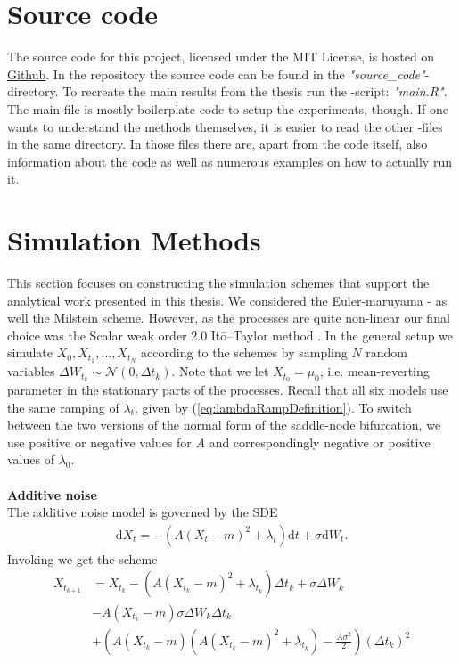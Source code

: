 \section{Source code}
The source code for this project, licensed under the MIT License, is hosted on \href{https://github.com/Gantzhorn/Thesis}{Github}. In the repository the source code can be found in the \textit{"source\_code"}-directory. To recreate the main results from the thesis run the -script: \textit{"main.R"}. The main-file is mostly boilerplate code to setup the experiments, though. If one wants to understand the methods themselves, it is easier to read the other -files in the same directory. In those files there are, apart from the code itself, also information about the code as well as numerous examples on how to actually run it. 
\section{Simulation Methods}\label{appendix:simMethods}
This section focuses on constructing the simulation schemes that support the analytical work presented in this thesis. We considered the Euler-maruyama - as well the Milstein scheme. However, as the processes are quite non-linear our final choice was the Scalar weak order 2.0 Itō–Taylor method \cite[algorithm 8.5]{Srkk2019}. In the general setup we simulate $X_0,X_{t_1},\dots, X_{t_N}$ according to the schemes by sampling $N$ random variables $\Delta W_{t_k}\sim\mathcal{N}\left(0, \Delta t_k\right)$. Note that we let $X_{t_0} = \mu_0$, i.e. mean-reverting parameter in the stationary parts of the processes. Recall that all six models use the same ramping of $\lambda_t$, given by (\ref{eq:lambdaRampDefinition}). To switch between the two versions of the normal form of the saddle-node bifurcation, we use positive or negative values for $A$ and correspondingly negative or positive values of $\lambda_0$. \\\\
\noindent \textbf{Additive noise}\\
The additive noise model is governed by the SDE
\begin{align}
    \mathrm{d}X_t = -\left(A(X_t - m)^2 + \lambda_t\right)\mathrm{d}t + \sigma \mathrm{d}W_t.
\end{align}
Invoking \cite[algorithm 8.5]{Srkk2019} we get the scheme
\begin{align}
    X_{t_{k + 1}} &= X_{t_k} - \left(A(X_{t_k} - m)^2 + \lambda_{t_k}\right) \Delta t_k + \sigma \Delta W_{k} \nonumber \\&-  A \left(X_{t_k} - m\right)\sigma \Delta W_k \Delta t_k\nonumber \\
    & + \left(A\left(X_{t_k} - m\right)\left(A\left(X_{t_k} - m\right)^2 + \lambda_{t_k}\right) - \frac{A \sigma^2}{2}\right)\left(\Delta t_k\right)^2 \label{eq:OUSim}
\end{align}
